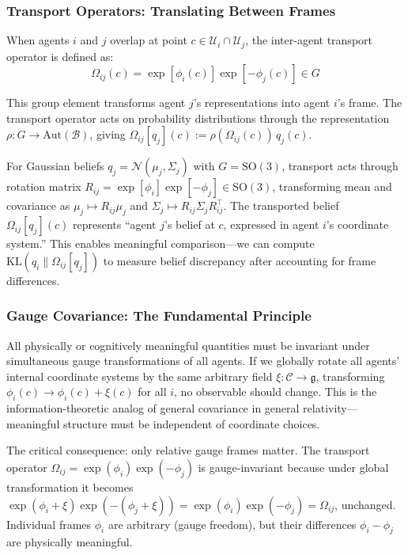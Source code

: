 \documentclass[11pt]{article}
\begin{document}
\subsubsection{Transport Operators: Translating Between Frames}

When agents $i$ and $j$ overlap at point $c \in \mathcal{U}_i \cap \mathcal{U}_j$, the inter-agent transport operator is defined as:
\begin{equation}
\Omega_{ij}(c) = \exp[\phi_i(c)] \exp[-\phi_j(c)] \in G
\end{equation}

This group element transforms agent $j$'s representations into agent $i$'s frame. The transport operator acts on probability distributions through the representation $\rho: G \to \mathrm{Aut}(\mathcal{B})$, giving $\Omega_{ij}[q_j](c) := \rho(\Omega_{ij}(c)) \, q_j(c)$.

For Gaussian beliefs $q_j = \mathcal{N}(\mu_j, \Sigma_j)$ with $G = \mathrm{SO}(3)$, transport acts through rotation matrix $R_{ij} = \exp[\phi_i]\exp[-\phi_j] \in \mathrm{SO}(3)$, transforming mean and covariance as $\mu_j \mapsto R_{ij} \mu_j$ and $\Sigma_j \mapsto R_{ij} \Sigma_j R_{ij}^\top$. The transported belief $\Omega_{ij}[q_j](c)$ represents ``agent $j$'s belief at $c$, expressed in agent $i$'s coordinate system.'' This enables meaningful comparison---we can compute $\mathrm{KL}(q_i \| \Omega_{ij}[q_j])$ to measure belief discrepancy after accounting for frame differences.

\subsubsection{Gauge Covariance: The Fundamental Principle}

All physically or cognitively meaningful quantities must be invariant under simultaneous gauge transformations of all agents. If we globally rotate all agents' internal coordinate systems by the same arbitrary field $\xi: \mathcal{C} \to \mathfrak{g}$, transforming $\phi_i(c) \to \phi_i(c) + \xi(c)$ for all $i$, no observable should change. This is the information-theoretic analog of general covariance in general relativity---meaningful structure must be independent of coordinate choices.

The critical consequence: only relative gauge frames matter. The transport operator $\Omega_{ij} = \exp(\phi_i)\exp(-\phi_j)$ is gauge-invariant because under global transformation it becomes $\exp(\phi_i + \xi)\exp(-(\phi_j + \xi)) = \exp(\phi_i)\exp(-\phi_j) = \Omega_{ij}$, unchanged. Individual frames $\phi_i$ are arbitrary (gauge freedom), but their differences $\phi_i - \phi_j$ are physically meaningful.
\end{document}
